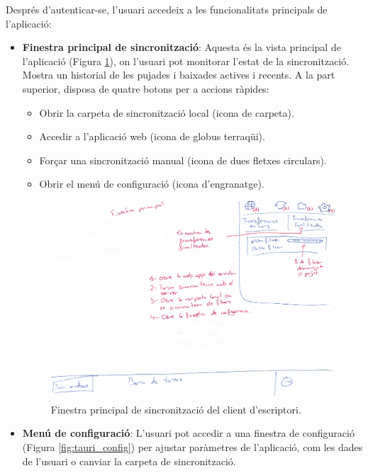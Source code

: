 Després d'autenticar-se, l'usuari accedeix a les funcionalitats principals de l'aplicació:
\begin{itemize}
    \item \textbf{Finestra principal de sincronització}: Aquesta és la vista principal de l'aplicació (Figura \ref{fig:tauri_main}), on l'usuari pot monitorar l'estat de la sincronització. Mostra un historial de les pujades i baixades actives i recents. A la part superior, disposa de quatre botons per a accions ràpides:
    \begin{itemize}
        \item Obrir la carpeta de sincronització local (icona de carpeta).
        \item Accedir a l'aplicació web (icona de globus terraqüi).
        \item Forçar una sincronització manual (icona de dues fletxes circulars).
        \item Obrir el menú de configuració (icona d'engranatge).
    \end{itemize}

    \begin{figure}[H]
        \centering
        \includegraphics[width=\textwidth]{Figures/interficies/tauri-pantalla-principal.jpg}
        \caption{Finestra principal de sincronització del client d'escriptori.}
        \label{fig:tauri_main}
    \end{figure}

    \item \textbf{Menú de configuració}: L'usuari pot accedir a una finestra de configuració (Figura \ref{fig:tauri_config}) per ajustar paràmetres de l'aplicació, com les dades de l'usuari o canviar la carpeta de sincronització.


\end{itemize}
